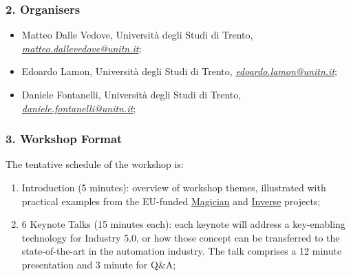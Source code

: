 \documentclass{article}
\newcommand{\email}[1]{\href{mailto:#1}{\itshape #1}}
\begin{document}
\subsubsection*{2. Organisers}
\begin{itemize}
    \item Matteo Dalle Vedove, Università degli Studi di Trento, \email{matteo.dallevedove@unitn.it};
    \item Edoardo Lamon, Università degli Studi di Trento, \email{edoardo.lamon@unitn.it};
    \item Daniele Fontanelli, Università degli Studi di Trento, \email{daniele.fontanelli@unitn.it};
\end{itemize}

\subsubsection*{3. Workshop Format}
% 

The tentative schedule of the workshop is:
\begin{enumerate}
    \item Introduction (5 minutes): overview of workshop themes, illustrated with practical examples from the EU-funded \href{https://www.magician-project.eu/}{Magician} and \href{https://www.inverse-project.org/}{Inverse} projects;
    \item 6 Keynote Talks (15 minutes each): each keynote will address a key-enabling technology for Industry 5.0, or how those concept can be transferred to the state-of-the-art in the automation industry. The talk comprises a 12 minute presentation and 3 minute for Q\&A;
\end{enumerate}
\end{document}
